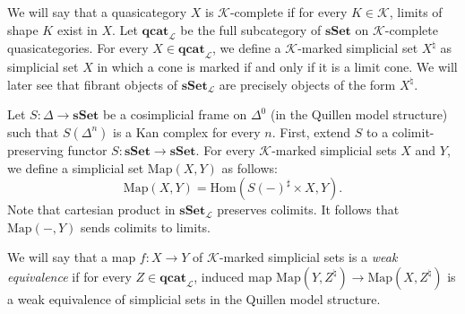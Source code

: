 \documentclass[reqno]{amsart}
\theoremstyle{definition}
\theoremstyle{remark}
\newcommand{\cat}[1]{\mathbf{#1}}
\newcommand{\sSet}{\cat{sSet}}
\newcommand{\K}{$\mathcal{K}$}
\newcommand{\csSet}{\sSet_\mathcal{L}}
\newcommand{\cqCat}{\cat{qcat}_\mathcal{L}}
\newcommand{\Hom}{\mathrm{Hom}}
\newcommand{\Map}{\mathrm{Map}}
\numberwithin{figure}{section}
\begin{document}
We will say that a quasicategory $X$ is \K-complete if for every $K \in \mathcal{K}$, limits of shape $K$ exist in $X$.
Let $\cqCat$ be the full subcategory of $\sSet$ on \K-complete quasicategories.
For every $X \in \cqCat$, we define a \K-marked simplicial set $X^\natural$ as simplicial set $X$ in which a cone is marked if and only if it is a limit cone.
We will later see that fibrant objects of $\csSet$ are precisely objects of the form $X^\natural$.

Let $S : \Delta \to \sSet$ be a cosimplicial frame on $\Delta^0$ (in the Quillen model structure) such that $S(\Delta^n)$ is a Kan complex for every $n$.
First, extend $S$ to a colimit-preserving functor $S : \sSet \to \sSet$.
For every \K-marked simplicial sets $X$ and $Y$, we define a simplicial set $\Map(X,Y)$ as follows:
\[ \Map(X,Y) = \Hom(S(-)^\sharp \times X, Y). \]
Note that cartesian product in $\csSet$ preserves colimits.
It follows that $\Map(-,Y)$ sends colimits to limits.

We will say that a map $f : X \to Y$ of \K-marked simplicial sets is a \emph{weak equivalence} if for every $Z \in \cqCat$,
induced map $\Map(Y,Z^\natural) \to \Map(X,Z^\natural)$ is a weak equivalence of simplicial sets in the Quillen model structure.
\end{document}
